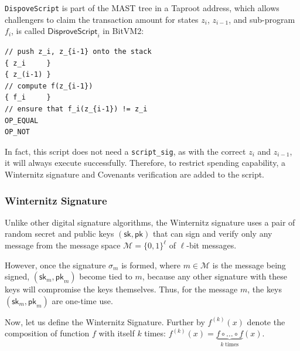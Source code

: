\documentclass{iacrtrans}
\begin{document}
\texttt{DispoveScript} is part of the MAST tree in a Taproot address,
which allows challengers to claim the transaction amount for states
\(z_i\), \(z_{i-1}\), and sub-program \(f_i\), is called
\(\mathsf{DisproveScript}_i\) in BitVM2:

\begin{verbatim}
// push z_i, z_{i-1} onto the stack
{ z_i     }
{ z_(i-1) }
// compute f(z_{i-1})
{ f_i     }
// ensure that f_i(z_{i-1}) != z_i
OP_EQUAL
OP_NOT
\end{verbatim}

In fact, this script does not need a \texttt{script\_sig}, as with the
correct \(z_i\) and \(z_{i-1}\), it will always execute
successfully. Therefore, to restrict spending capability, a Winternitz
signature and Covenants verification are added to the script.

\subsubsection{Winternitz Signature}\label{sec:lamport-signature}

Unlike other digital signature algorithms, the Winternitz signature
uses a pair of random secret and public keys
$(\mathsf{sk}, \mathsf{pk})$ that can sign and verify only any message
from the message space \(\mathcal{M} = {\{0, 1\}}^{\ell}\) of
$\ell$-bit messages.

However, once the signature $\sigma_{m}$ is formed, where
$m \in \mathcal{M}$ is the message being signed,
\((\mathsf{sk}_{m}, \mathsf{pk}_{m})\) become tied to \(m\), because
any other signature with these keys will compromise the keys
themselves. Thus, for the message \(m\), the keys
\((\mathsf{sk}_{m}, \mathsf{pk}_{m})\) are one-time use.

Now, let us define the Winternitz Signature. Further by $f^{(k)}(x)$
denote the composition of function $f$ with itself $k$ times:
$f^{(k)}(x) = \underbrace{f \circ \dots \circ f}_{k \; \text{times}}(x)$.
\end{document}
